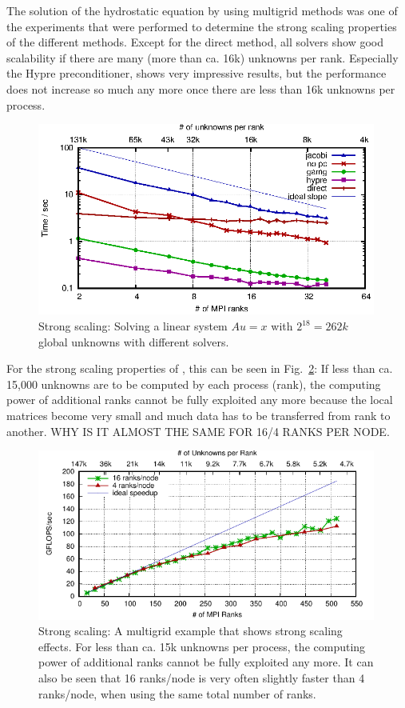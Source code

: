 The solution of the hydrostatic equation by using multigrid methods was one of the experiments that were performed to determine the strong scaling properties of the different methods. Except for the direct method, all solvers show good scalability if there are many (more than ca. 16k) unknowns per rank. Especially  the Hypre \cite{hypre-web-page} preconditioner, shows very impressive results, but the performance does not increase so much any more once there are less than 16k unknowns per process. 


\begin{figure}[tb]
	\centering
	\includegraphics[width=0.99\textwidth]{ex2_times}
	\caption{Strong scaling: Solving a linear system $Au = x$ with $2^{18} = 262k$ global unknowns with different solvers.} 
	\label{fig:res_ex2_strong_time}
\end{figure}




For the strong scaling properties of , this can be seen in Fig.~\ref{fig:res_ex48}: If less than ca. 15,000 unknowns are to be computed by each process (rank), the computing power of additional ranks cannot be fully exploited any more because the local matrices become very small and much data has to be transferred from rank to another. {\color{red} WHY IS IT ALMOST THE SAME FOR 16/4 RANKS PER NODE.}

\begin{figure}[tb]
	\centering
	\includegraphics[width=0.99\textwidth]{ex48}
	\caption{Strong scaling: A multigrid example that shows strong scaling effects. For less than ca. 15k unknowns per process, the computing power of additional ranks cannot be fully exploited any more. It can also be seen that 16 ranks/node is very often slightly faster than 4 ranks/node, when using the same total number of ranks.} 
	\label{fig:res_ex48}
\end{figure}


